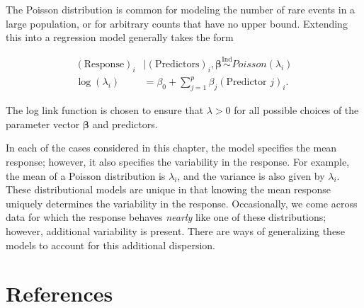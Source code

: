 \documentclass[
  letterpaper,
  DIV=11,
  numbers=noendperiod]{scrreprt}
\theoremstyle{definition}
\theoremstyle{definition}
\theoremstyle{plain}
\theoremstyle{remark}
\begin{document}
The Poisson distribution is common for modeling the number of rare
events in a large population, or for arbitrary counts that have no upper
bound. Extending this into a regression model generally takes the form

\[
\begin{aligned}
  (\text{Response})_i &\mid (\text{Predictors})_i, \boldsymbol{\beta} \stackrel{\text{Ind}}{\sim}Poisson\left(\lambda_i\right) \\
  \log\left(\lambda_i\right) &= \beta_0 + \sum_{j=1}^{p} \beta_j (\text{Predictor } j)_i.
\end{aligned}
\]

The log link function is chosen to ensure that \(\lambda > 0\) for all
possible choices of the parameter vector \(\boldsymbol{\beta}\) and
predictors.

In each of the cases considered in this chapter, the model specifies the
mean response; however, it also specifies the variability in the
response. For example, the mean of a Poisson distribution is
\(\lambda_i\), and the variance is also given by \(\lambda_i\). These
distributional models are unique in that knowing the mean response
uniquely determines the variability in the response. Occasionally, we
come across data for which the response behaves \emph{nearly} like one
of these distributions; however, additional variability is present.
There are ways of generalizing these models to account for this
additional dispersion.


\hypertarget{references}{%
\chapter*{References}\label{references}}

\end{document}
